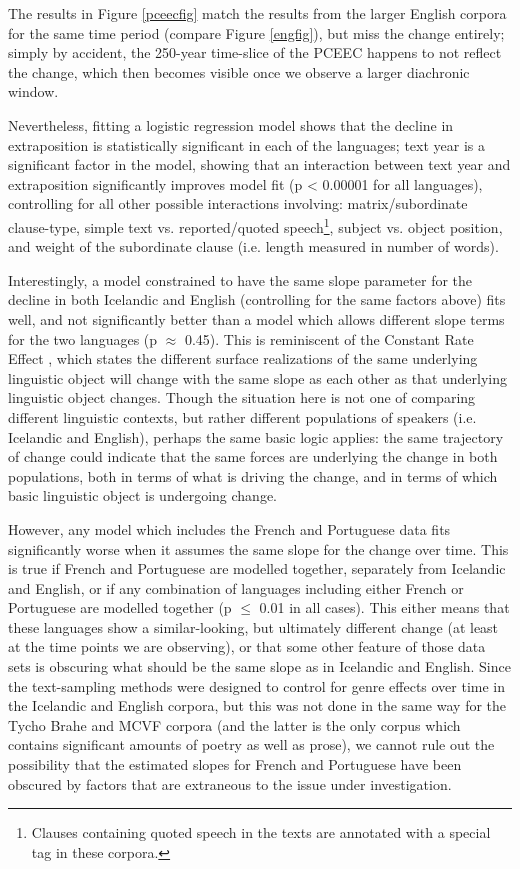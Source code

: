 \noindent The results in Figure \ref{pceecfig} match the results from the larger English corpora for the same time period (compare Figure \ref{engfig}), but miss the change entirely; simply by accident, the 250-year time-slice of the PCEEC happens to not reflect the change, which then becomes visible once we observe a larger diachronic window.

Nevertheless, fitting a logistic regression model shows that the decline in extraposition is statistically significant in each of the languages; text year is a significant factor in the model, showing that an interaction between text year and extraposition significantly improves model fit (p < 0.00001 for all languages), controlling for all other possible interactions involving: matrix/subordinate clause-type, simple text vs. reported/quoted speech\footnote{Clauses containing quoted speech in the texts are annotated with a special tag in these corpora.}, subject vs. object position, and weight of the subordinate clause (i.e. length measured in number of words).

Interestingly, a model constrained to have the same slope parameter for the decline in both Icelandic and English (controlling for the same factors above) fits well, and not significantly better than a model which allows different slope terms for the two languages (p $\approx$ 0.45). This is reminiscent of the Constant Rate Effect \citep[][among others]{kroch1989, pintzuk1991, santorini1993a}, which states the different surface realizations of the same underlying linguistic object will change with the same slope as each other as that underlying linguistic object changes. Though the situation here is not one of comparing different linguistic contexts, but rather different populations of speakers (i.e. Icelandic and English), perhaps the same basic logic applies: the same trajectory of change could indicate that the same forces are underlying the change in both populations, both in terms of what is driving the change, and in terms of which basic linguistic object is undergoing change. 

However, any model which includes the French and Portuguese data fits significantly worse when it assumes the same slope for the change over time. This is true if French and Portuguese are modelled together, separately from Icelandic and English, or if any combination of languages including either French or Portuguese are modelled together (p $\leq$ 0.01 in all cases). This either means that these languages show a similar-looking, but ultimately different change (at least at the time points we are observing), or that some other feature of those data sets is obscuring what should be the same slope as in Icelandic and English. Since the text-sampling methods were designed to control for genre effects over time in the Icelandic and English corpora, but this was not done in the same way for the Tycho Brahe and MCVF corpora (and the latter is the only corpus which contains significant amounts of poetry as well as prose), we cannot rule out the possibility that the estimated slopes for French and Portuguese have been obscured by factors that are extraneous to the issue under investigation.

